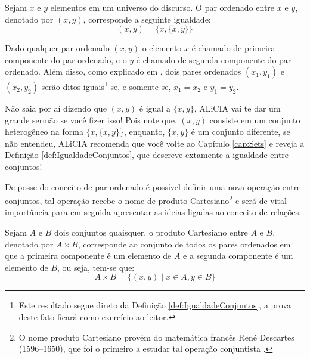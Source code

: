 \begin{definicao}\label{def:ParOrdenado}
    Sejam $x$ e $y$ elementos em um universo do discurso. O par ordenado entre $x$ e $y$, denotado por $(x, y)$, corresponde a seguinte igualdade:
    \begin{equation*}
        (x, y) = \{x, \{x, y\}\}
    \end{equation*}
\end{definicao}

Dado qualquer par ordenado $(x, y)$ o elemento $x$ é chamado de primeira componente do par ordenado, e o $y$ é chamado de segunda componente do par ordenado. Além disso, como explicado em \cite{lipschutz1978-TC, lipschutz2013-MD}, dois pares ordenados $(x_1, y_1)$ e $(x_2, y_2)$ serão ditos iguais\footnote{Este resultado segue direto da Definição \ref{def:IgualdadeConjuntos}, a prova deste fato ficará como exercício ao leitor.} se, e somente se, $x_1 = x_2$ e $y_1 = y_2$.

\begin{cuidado}
    Não saia por aí dizendo que $(x, y)$ é igual a $\{x, y\}$, ALiCIA vai te dar um grande sermão se você fizer isso! Pois note que, $(x, y)$ consiste em um conjunto heterogêneo na forma $\{x, \{x, y\}\}$, enquanto, $\{x, y\}$ é um conjunto diferente, se não entendeu, ALiCIA recomenda que você volte ao Capítulo \ref{cap:Sets} e reveja a Definição \ref{def:IgualdadeConjuntos}, que descreve extamente a igualdade entre conjuntos!
\end{cuidado}

De posse do conceito de par ordenado é possível definir uma nova operação entre conjuntos, tal operação recebe o nome de produto Cartesiano\footnote{O nome produto Cartesiano provém do matemática francês René Descartes (1596--1650), que foi o primeiro a estudar tal operação conjuntista \cite{lipschutz1978-TC}.} e será de vital importância para em seguida apresentar as ideias ligadas ao conceito de relações.

\begin{definicao}\label{def:ProdutoCartesiano}
    Sejam $A$ e $B$ dois conjuntos quaisquer, o produto Cartesiano entre $A$ e $B$, denotado por $A \times B$, corresponde ao conjunto de todos os pares ordenados em que a primeira componente é um elemento de $A$ e a segunda componente é um elemento de $B$, ou seja, tem-se que:
    \begin{equation*}
        A \times B = \{(x, y) \mid x \in A, y \in B\}
    \end{equation*}
\end{definicao}

